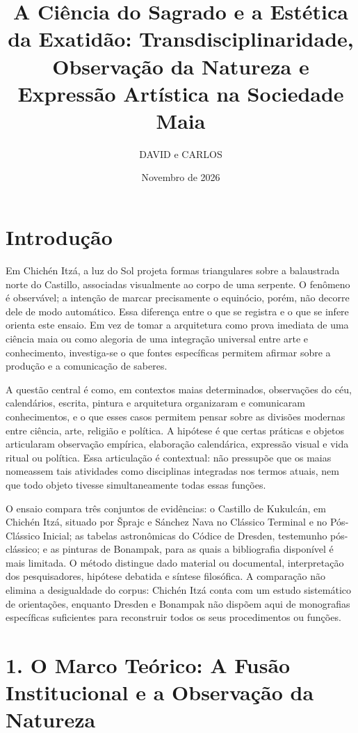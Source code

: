 \documentclass[
  brazilian,
]{article}
\title{A Ciência do Sagrado e a Estética da Exatidão:
Transdisciplinaridade, Observação da Natureza e Expressão Artística na
Sociedade Maia}
\author{DAVID e CARLOS}
\date{Novembro de 2026}
\begin{document}
\maketitle

\section{Introdução}\label{introduuxe7uxe3o}

Em Chichén Itzá, a luz do Sol projeta formas triangulares sobre a
balaustrada norte do Castillo, associadas visualmente ao corpo de uma
serpente. O fenômeno é observável; a intenção de marcar precisamente o
equinócio, porém, não decorre dele de modo automático. Essa diferença
entre o que se registra e o que se infere orienta este ensaio. Em vez de
tomar a arquitetura como prova imediata de uma ciência maia ou como
alegoria de uma integração universal entre arte e conhecimento,
investiga-se o que fontes específicas permitem afirmar sobre a produção
e a comunicação de saberes.

A questão central é como, em contextos maias determinados, observações
do céu, calendários, escrita, pintura e arquitetura organizaram e
comunicaram conhecimentos, e o que esses casos permitem pensar sobre as
divisões modernas entre ciência, arte, religião e política. A hipótese é
que certas práticas e objetos articularam observação empírica,
elaboração calendárica, expressão visual e vida ritual ou política. Essa
articulação é contextual: não pressupõe que os maias nomeassem tais
atividades como disciplinas integradas nos termos atuais, nem que todo
objeto tivesse simultaneamente todas essas funções.

O ensaio compara três conjuntos de evidências: o Castillo de Kukulcán,
em Chichén Itzá, situado por Šprajc e Sánchez Nava no Clássico Terminal
e no Pós-Clássico Inicial; as tabelas astronômicas do Códice de Dresden,
testemunho pós-clássico; e as pinturas de Bonampak, para as quais a
bibliografia disponível é mais limitada. O método distingue dado
material ou documental, interpretação dos pesquisadores, hipótese
debatida e síntese filosófica. A comparação não elimina a desigualdade
do corpus: Chichén Itzá conta com um estudo sistemático de orientações,
enquanto Dresden e Bonampak não dispõem aqui de monografias específicas
suficientes para reconstruir todos os seus procedimentos ou funções.

\section{1. O Marco Teórico: A Fusão Institucional e a Observação da
Natureza}\label{o-marco-teuxf3rico-a-fusuxe3o-institucional-e-a-observauxe7uxe3o-da-natureza}
\end{document}
